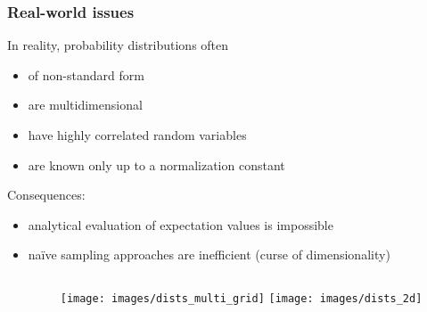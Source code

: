 \documentclass[t,aspectratio=169]{beamer}
\begin{document}
\begin{frame}
  \frametitle{Real-world issues}
  In reality, probability distributions often
  \begin{itemize}
  \item of non-standard form
  \item are multidimensional
  \item have highly correlated random variables
  \item are known only up to a normalization constant
  \end{itemize}
  Consequences:
  \begin{itemize}
  \item analytical evaluation of expectation values is impossible
  \item naïve sampling approaches are inefficient (curse of dimensionality)
  \end{itemize}
  \begin{columns}
    \begin{column}[T]{0.33\textwidth}
    \end{column}
    \begin{column}[T]{0.63\textwidth}
      \texttt{[image: images/dists\_multi\_grid]}
      \texttt{[image: images/dists\_2d]}
    \end{column}
  \end{columns}
\end{frame}
\end{document}
